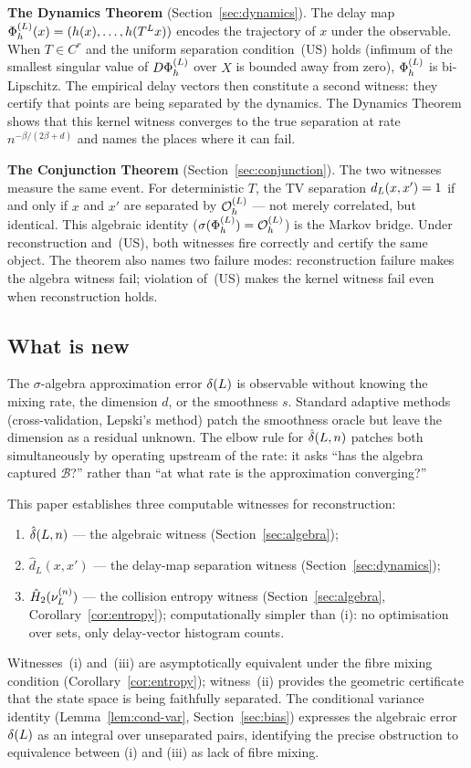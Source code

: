 \textbf{The Dynamics Theorem} (Section~\ref{sec:dynamics}).
The delay map $\Phi_h^{(L)}(x) = (h(x), \ldots, h(T^L x))$ encodes the
trajectory of $x$ under the observable.
When $T \in C^r$ and the uniform separation condition~(US)
holds (infimum of the smallest singular value of $D\Phi_h^{(L)}$ over $X$
is bounded away from zero), $\Phi_h^{(L)}$ is bi-Lipschitz.
The empirical delay vectors then constitute a second witness: they certify
that points are being separated by the dynamics.
The Dynamics Theorem shows that this kernel witness converges to the true
separation at rate $n^{-\beta/(2\beta+d)}$ and names the places where it can fail.

\textbf{The Conjunction Theorem} (Section~\ref{sec:conjunction}).
The two witnesses measure the same event.
For deterministic $T$, the TV separation $d_{L}(x,x') = 1$ if and
only if $x$ and $x'$ are separated by $\mathcal{O}_h^{(L)}$ --- not merely correlated, but
identical.
This algebraic identity ($\sigma(\Phi_h^{(L)}) = \mathcal{O}_h^{(L)}$) is the Markov bridge.
Under reconstruction and~(US), both witnesses fire correctly and certify the
same object.
The theorem also names two failure modes: reconstruction failure makes the
algebra witness fail; violation of~(US) makes the kernel witness fail even
when reconstruction holds.

\subsection{What is new}

The $\sigma$-algebra approximation error $\delta(L)$ is observable without
knowing the mixing rate, the dimension $d$, or the smoothness $s$.
Standard adaptive methods (cross-validation, Lepski's method) patch the
smoothness oracle but leave the dimension as a residual unknown.
The elbow rule for $\hat{\delta}(L,n)$ patches both simultaneously by operating
upstream of the rate: it asks ``has the algebra captured $\mathcal{B}$?''
rather than ``at what rate is the approximation converging?''

This paper establishes three computable witnesses for reconstruction:
\begin{enumerate}[label=(\roman*)]
  \item $\hat{\delta}(L,n)$ --- the algebraic witness (Section~\ref{sec:algebra});
  \item $\hat{d}_L(x,x')$ --- the delay-map separation witness
    (Section~\ref{sec:dynamics});
  \item $\hat{H}_2(\nu_L^{(n)})$ --- the collision entropy witness
    (Section~\ref{sec:algebra}, Corollary~\ref{cor:entropy});
    computationally simpler than (i): no optimisation over sets, only
    delay-vector histogram counts.
\end{enumerate}
Witnesses~(i) and~(iii) are asymptotically equivalent under the fibre mixing
condition (Corollary~\ref{cor:entropy}); witness~(ii) provides the geometric
certificate that the state space is being faithfully separated.
The conditional variance identity (Lemma~\ref{lem:cond-var}, Section~\ref{sec:bias})
expresses the algebraic error $\delta(L)$ as an integral over unseparated pairs,
identifying the precise obstruction to equivalence between (i) and (iii) as lack of fibre mixing.

